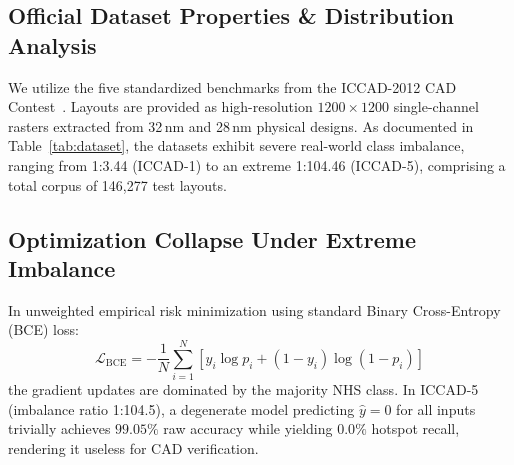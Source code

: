 \documentclass[conference]{IEEEtran}
\begin{document}
\subsection{Official Dataset Properties \& Distribution Analysis}
We utilize the five standardized benchmarks from the ICCAD-2012 CAD Contest~\cite{torres2012iccad}. Layouts are provided as high-resolution $1200 \times 1200$ single-channel rasters extracted from 32\,nm and 28\,nm physical designs. As documented in Table~\ref{tab:dataset}, the datasets exhibit severe real-world class imbalance, ranging from 1:3.44 (ICCAD-1) to an extreme 1:104.46 (ICCAD-5), comprising a total corpus of 146,277 test layouts.

\begin{table}[htbp]
\caption{Official ICCAD-12 Benchmark Dataset Class Distributions.}
\label{tab:dataset}
\centering
{}
\end{table}

\subsection{Optimization Collapse Under Extreme Imbalance}
In unweighted empirical risk minimization using standard Binary Cross-Entropy (BCE) loss:
\begin{equation}
\mathcal{L}_{\text{BCE}} = -\frac{1}{N} \sum_{i=1}^N \left[ y_i \log p_i + (1 - y_i) \log(1 - p_i) \right]
\end{equation}
the gradient updates are dominated by the majority NHS class. In ICCAD-5 (imbalance ratio 1:104.5), a degenerate model predicting $\hat{y}=0$ for all inputs trivially achieves $99.05\%$ raw accuracy while yielding $0.0\%$ hotspot recall, rendering it useless for CAD verification.
\end{document}
